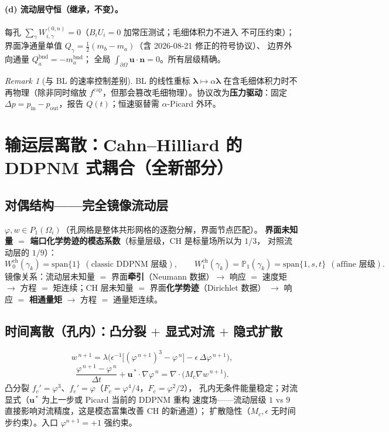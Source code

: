 \documentclass[11pt]{article}
\theoremstyle{definition}
\theoremstyle{plain}
\theoremstyle{remark}
\newtheorem{remarkx}[assumption]{Remark}
\newcommand{\vel}{\bm{u}}
\newcommand{\normal}{\bm{n}}
\newcommand{\iface}{\gamma}
\begin{document}
\paragraph{(d) 流动层守恒（继承，不变）。}
每孔 $\sum_\iface W_{i,\iface}^{(0,n)}=0$（$B_iU_i=0$ 加常压测试；毛细体积力不进入
不可压约束）；界面净通量单值 $Q_\iface=\tfrac12(m_b-m_a)$（含 2026-08-21 修正的符号协议）、
边界外向通量 $Q_a^{\mathrm{bnd}}=-m_a^{\mathrm{bnd}}$；
全局 $\int_{\partial\Omega}\vel\cdot\normal=0$。所有层级精确。

\begin{remarkx}[与 BL 的速率控制差别]\label{rem:rate}
BL 的线性重标 $\bm\lambda\mapsto\alpha\bm\lambda$ 在含毛细体积力时不再物理（除非同时缩放
$f^{\mathrm{cap}}$，但那会篡改毛细物理）。协议改为\textbf{压力驱动}：固定
$\Delta p=p_{\mathrm{in}}-p_{\mathrm{out}}$，报告 $Q(t)$；恒速驱替需 $\alpha$-Picard 外环。
\end{remarkx}

\section{输运层离散：Cahn--Hilliard 的 DDPNM 式耦合（全新部分）}

\subsection{对偶结构——完全镜像流动层}

$\varphi,w\in P_1(\Omega_i)$（孔网格是整体共形网格的逐胞分解，界面节点匹配）。
\textbf{界面未知量 $=$ 端口化学势迹的模态系数}（标量层级，CH 是标量场所以为 $1/3$，
对照流动层的 $1/9$）：
\begin{equation}
W^{\mathrm{ch}}_0(\iface_k)=\mathrm{span}\{1\}\ \ (\text{classic DDPNM 层级}),\qquad
W^{\mathrm{ch}}_1(\iface_k)=\mathbb P_1(\iface_k)=\mathrm{span}\{1,s,t\}\ \ (\text{affine 层级}).
\tag{S14}\label{eq:S14}
\end{equation}
镜像关系：流动层未知量 $=$ 界面\textbf{牵引}（Neumann 数据）$\to$ 响应 $=$ 速度矩
$\to$ 方程 $=$ 矩连续；CH 层未知量 $=$ 界面\textbf{化学势迹}（Dirichlet 数据）
$\to$ 响应 $=$ \textbf{相通量矩} $\to$ 方程 $=$ 通量矩连续。

\subsection{时间离散（孔内）：凸分裂 $+$ 显式对流 $+$ 隐式扩散}
\begin{equation}
w^{\,n+1}=\lambda\Big(\epsilon^{-1}\big[(\varphi^{\,n+1})^3-\varphi^{\,n}\big]
-\epsilon\,\Delta\varphi^{\,n+1}\Big),
\tag{S15}\label{eq:S15}
\end{equation}
\begin{equation}
\frac{\varphi^{\,n+1}-\varphi^{\,n}}{\Delta t}
+\vel^{\,\ast}\cdot\nabla\varphi^{\,n}
=\nabla\cdot\big(M_c\nabla w^{\,n+1}\big).
\tag{S16}\label{eq:S16}
\end{equation}
凸分裂 $f_c'=\varphi^3$、$f_e'=\varphi$（$F_c=\varphi^4/4$，$F_e=\varphi^2/2$），
孔内无条件能量稳定；对流显式（$\vel^{\,\ast}$ 为上一步或 Picard 当前的 DDPNM 重构
速度场——流动层级 $1$ vs $9$ 直接影响对流精度，这是模态富集改善 CH 的新通道）；
扩散隐性（$M_c,\epsilon$ 无时间步约束）。入口 $\varphi^{n+1}=+1$ 强约束。
\end{document}
